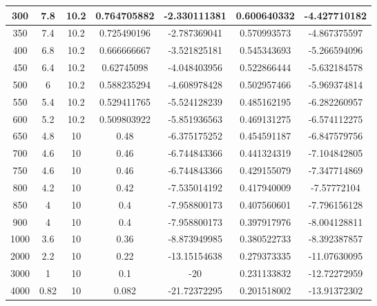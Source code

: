 \documentclass[a4paper,11pt]{jsarticle}
\begin{document}
\begin{center}
\begin{longtable}{|c|c|c|c|c|c|c|}
    300                 & 7.8       & 10.2     & 0.764705882 & -2.330111381 & 0.600640332 & -4.427710182 \\ \hline
    350                 & 7.4       & 10.2     & 0.725490196 & -2.787369041 & 0.570993573 & -4.867375597 \\ \hline
    400                 & 6.8       & 10.2     & 0.666666667 & -3.521825181 & 0.545343693 & -5.266594096 \\ \hline
    450                 & 6.4       & 10.2     & 0.62745098  & -4.048403956 & 0.522866444 & -5.632184578 \\ \hline
    500                 & 6         & 10.2     & 0.588235294 & -4.608978428 & 0.502957466 & -5.969374814 \\ \hline
    550                 & 5.4       & 10.2     & 0.529411765 & -5.524128239 & 0.485162195 & -6.282260957 \\ \hline
    600                 & 5.2       & 10.2     & 0.509803922 & -5.851936563 & 0.469131275 & -6.574112275 \\ \hline
    650                 & 4.8       & 10       & 0.48        & -6.375175252 & 0.454591187 & -6.847579756 \\ \hline
    700                 & 4.6       & 10       & 0.46        & -6.744843366 & 0.441324319 & -7.104842805 \\ \hline
    750                 & 4.6       & 10       & 0.46        & -6.744843366 & 0.429155079 & -7.347714869 \\ \hline
    800                 & 4.2       & 10       & 0.42        & -7.535014192 & 0.417940009 & -7.57772104  \\ \hline
    850                 & 4         & 10       & 0.4         & -7.958800173 & 0.407560601 & -7.796156128 \\ \hline
    900                 & 4         & 10       & 0.4         & -7.958800173 & 0.397917976 & -8.004128811 \\ \hline
    1000                & 3.6       & 10       & 0.36        & -8.873949985 & 0.380522733 & -8.392387857 \\ \hline
    2000                & 2.2       & 10       & 0.22        & -13.15154638 & 0.279373335 & -11.07630095 \\ \hline
    3000                & 1         & 10       & 0.1         & -20          & 0.231133832 & -12.72272959 \\ \hline
    4000                & 0.82      & 10       & 0.082       & -21.72372295 & 0.201518002 & -13.91372302 \\ \hline

\end{longtable}
\end{center}
\end{document}

